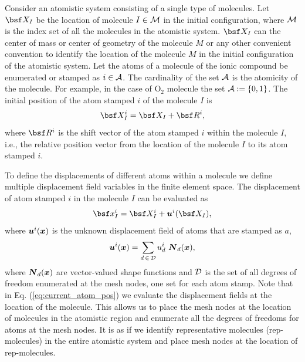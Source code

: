 \documentclass[a4paper,10pt]{article}
\newcommand{\refeq}[1]{Eq. (\ref{eq:#1})}
\def\gz  #1{           \mbox{\boldmath $\mit #1$}}
\def\mcl  #1{               {\cal #1}}
\begin{document}
Consider an atomistic system consisting of a single type of molecules.
Let $\bsf X_I$ be the location of molecule $I \in \mcl M$ in the initial 
configuration, where $\mcl M$ is the index set of all the molecules in the 
atomistic system. $\bsf X_I$ can the center of mass or center of geometry of 
the molecule $M$ or any other convenient convention to identify the location of 
the molecule $M$ in the initial configuration of the atomistic system. Let the 
atoms of a molecule of the ionic compound be enumerated or stamped as $i \in 
\mcl A$. The cardinality of the set $\mcl A$ is the atomicity of the molecule. 
For example, in the case of O$_2$ molecule the set $\mcl A := \left\lbrace 0,1 
\right\rbrace$. The initial position of the atom stamped $i$ of the molecule 
$I$ is
\begin{align}
 \bsf X_I ^i = \bsf X_I + \bsf R^i,
\end{align}
where $\bsf R^i$ is the shift vector of the atom stamped $i$ within the 
molecule $I$, i.e., the relative position vector from the location of the 
molecule $I$ to its atom stamped $i$.

To define the displacements of different atoms within a molecule we define
multiple displacement field variables in the finite element space. The 
displacement of atom stamped $i$ in the molecule $I$ can be 
evaluated as
\begin{align}
 \bsf x_I^i = \bsf X_I^i + \gz u^i(\bsf X_I),
 \label{eq:current_atom_pos}
\end{align}
where $\gz u^i( \gz x)$ is the unknown displacement field of atoms that are 
stamped as $a$,
\begin{align}
 \gz u^i (\gz x) = \sum_{d \, \in \, \mcl D} u^i_d \,\, \gz N_d (\gz x),
\end{align}
where $\gz N_d (\gz x)$ are vector-valued shape functions and $\mcl D$ is the 
set of all degrees of freedom enumerated at the mesh nodes, one set for each 
atom stamp.
Note that in \refeq{current_atom_pos} we evaluate the displacement fields at 
the location of the molecule. This allows us to place the mesh nodes at the 
location of molecules in the atomistic region and enumerate all the degrees of 
freedoms for atoms at the mesh nodes. It is as if we identify representative 
molecules (rep-molecules) in the entire atomistic system and place mesh nodes 
at the location of rep-molecules.
\end{document}
